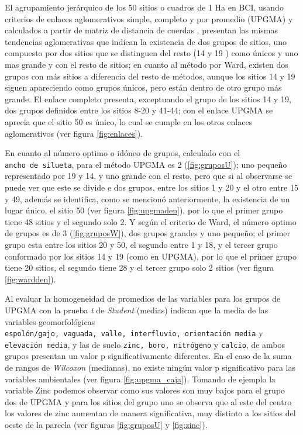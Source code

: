 \documentclass[11pt,]{article}
\begin{document}
El agrupamiento jerárquico de los 50 sitios o cuadros de 1 Ha en BCI,
usando criterios de enlaces aglomerativos simple, completo y por
promedio (UPGMA) y calculados a partir de matriz de distancia de cuerdas
, presentan las mismas tendencias aglomerativas que indican la
existencia de dos grupos de sitios, uno compuesto por dos sitios que se
distinguen del resto (14 y 19 ) como únicos y uno mas grande y con el
resto de sitios; en cuanto al método por Ward, existen dos grupos con
más sitios a diferencia del resto de métodos, aunque los sitios 14 y 19
siguen apareciendo como grupos únicos, pero están dentro de otro grupo
más grande. El enlace completo presenta, exceptuando el grupo de los
sitios 14 y 19, dos grupos definidos entre los sitios 8-20 y 41-44; con
el enlace UPGMA se aprecia que el sitio 50 es único, lo cual se cumple
en los otros enlaces aglomerativos (ver figura \ref{fig:enlaces}).

En cuanto al número optimo o idóneo de grupos, calculado con el
\texttt{ancho\ de\ silueta}, para el método UPGMA es 2
(\ref{fig:gruposU}); uno pequeño representado por 19 y 14, y uno grande
con el resto, pero que si al observarse se puede ver que este se divide
e dos grupos, entre los sitios 1 y 20 y el otro entre 15 y 49, además se
identifica, como se mencionó anteriormente, la existencia de un lugar
único, el sitio 50 (ver figura \ref{fig:upgmaden}), por lo que el primer
grupo tiene 48 sitios y el segundo solo 2. Y según el criterio de Ward,
el número optimo de grupos es de 3 (\ref{fig:gruposW}), dos grupos
grandes y uno pequeño; el primer grupo esta entre los sitios 20 y 50, el
segundo entre 1 y 18, y el tercer grupo conformado por los sitios 14 y
19 (como en UPGMA), por lo que el primer grupo tiene 20 sitios, el
segundo tiene 28 y el tercer grupo solo 2 sitios (ver figura
\ref{fig:wardden}).

Al evaluar la homogeneidad de promedios de las variables para los grupos
de UPGMA con la prueba \emph{t} de \emph{Student} (medias) indican que
la media de las variables geomorfológicas
\texttt{espolón/gajo,\ vaguada,\ valle,\ interfluvio,\ orientación\ media}
y \texttt{elevación\ media}, y las de suelo
\texttt{zinc,\ boro,\ nitrógeno} y \texttt{calcio}, de ambos grupos
presentan un valor p significativamente diferentes. En el caso de la
suma de rangos de \emph{Wilcoxon} (medianas), no existe ningún valor p
significativo para las variables ambientales (ver figura
\ref{fig:upgma_caja}). Tomando de ejemplo la variable Zinc podemos
observar como sus valores son muy bajos para el grupo dos de UPGMA y
para los sitios del grupo uno se observa que al este del centro los
valores de zinc aumentan de manera significativa, muy distinto a los
sitios del oeste de la parcela (ver figuras \ref{fig:gruposU} y
\ref{fig:zinc}).
\end{document}
